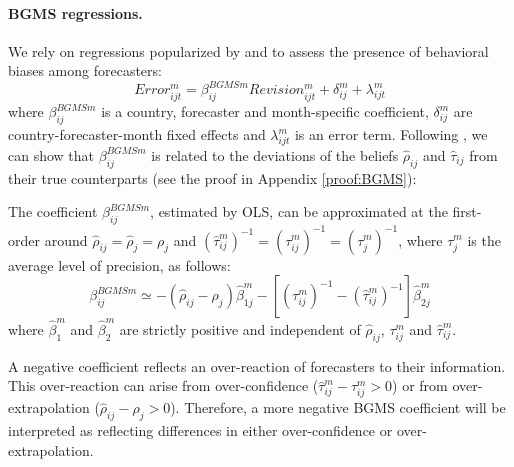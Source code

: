 
\paragraph{BGMS regressions.}

We rely on regressions popularized by \citet{Bordaloetal2020} and \citet{BroerKohlhas2019} to assess the presence of behavioral biases among forecasters:
\begin{equation}Error_{ijt}^m=\beta^{BGMSm}_{ij}Revision^m_{ijt}+\delta_{ij}^m+\lambda_{ijt}^m\label{eq:BGMS}
\end{equation}
where $\beta^{BGMSm}_{ij}$ is a country, forecaster and month-specific coefficient, $\delta_{ij}^m$ are country-forecaster-month fixed effects and $\lambda_{ijt}^m$ is an error term. Following \citet{Angeletosetal2020}, we can show that $\beta^{BGMSm}_{ij}$ is related to the deviations of the beliefs $\hat\rho_{ij}$ and $\hat\tau_{ij}$ from their true counterparts (see the proof in Appendix \ref{proof:BGMS}):
\begin{prop}\label{prop:BGMS} The coefficient $\beta^{BGMSm}_{ij}$, estimated by OLS, can be approximated at the first-order around $\hat\rho_{ij}=\hat\rho_{j}=\rho_{j}$ and $(\hat\tau_{ij}^m)^{-1}=(\tau_{ij}^m)^{-1}=(\tau_j^m)^{-1}$, where $\tau_j^m$ is the average level of precision, as follows:
$$\beta^{BGMSm}_{ij}\simeq -(\hat\rho_{ij}-\rho_{j})\hat\beta_{1j}^m- [(\tau_{ij}^m)^{-1}-(\hat\tau_{ij}^m)^{-1}]\hat\beta_{2j}^m$$
where $\hat\beta_1^m$ and $\hat\beta_2^m$ are strictly positive and independent of $\hat\rho_{ij}$, $\tau_{ij}^m$ and $\hat\tau_{ij}^m$.
\end{prop}
A negative coefficient reflects an over-reaction of forecasters to their information. This over-reaction can arise from over-confidence ($\hat\tau_{ij}^m-\tau_{ij}^m>0$) or from over-extrapolation ($\hat\rho_{ij} -\rho_j>0$).
 Therefore, a more negative BGMS coefficient will be interpreted as reflecting differences in either over-confidence or over-extrapolation.

